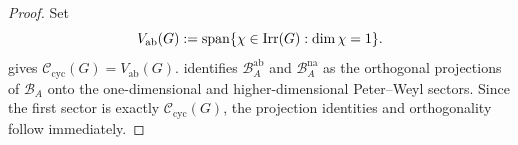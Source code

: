 \begin{proof}
  Set
  \[
    V_{\mathrm{ab}}(G)
    :=
    \operatorname{span}\{\chi\in\operatorname{Irr}(G):\dim\chi=1\}.
  \]
   gives
  \(\mathscr C_{\mathrm{cyc}}(G)=V_{\mathrm{ab}}(G)\).
   identifies
  \(\mathcal B_A^{\mathrm{ab}}\) and \(\mathcal B_A^{\mathrm{na}}\) as
  the orthogonal projections of \(\mathcal B_A\) onto the
  one-dimensional and higher-dimensional Peter--Weyl sectors. Since the
  first sector is exactly \(\mathscr C_{\mathrm{cyc}}(G)\), the
  projection identities and orthogonality follow immediately.
\end{proof}
